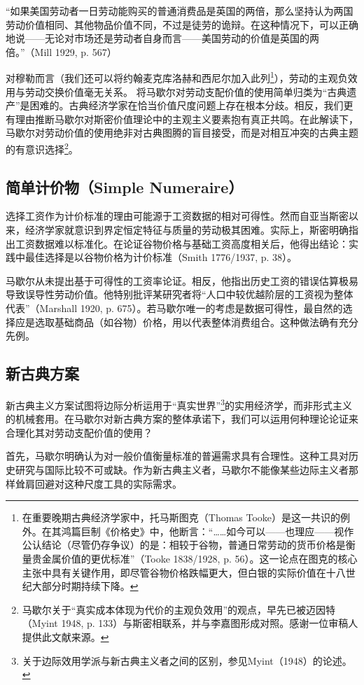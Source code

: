 \begin{translation}
“如果美国劳动者一日劳动能购买的普通消费品是英国的两倍，那么坚持认为两国劳动价值相同、其他物品价值不同，不过是徒劳的诡辩。在这种情况下，可以正确地说——无论对市场还是劳动者自身而言——美国劳动的价值是英国的两倍。”（Mill 1929, p. 567）

对穆勒而言（我们还可以将约翰麦克库洛赫和西尼尔加入此列\footnote{在重要晚期古典经济学家中，托马斯图克（Thomas Tooke）是这一共识的例外。在其鸿篇巨制《价格史》中，他断言：“……如今可以——也理应——视作公认结论（尽管仍存争议）的是：相较于谷物，普通日常劳动的货币价格是衡量贵金属价值的更优标准”（Tooke 1838/1928, p. 56）。这一论点在图克的核心主张中具有关键作用，即尽管谷物价格跌幅更大，但白银的实际价值在十八世纪大部分时期持续下降。}），劳动的主观负效用与劳动交换价值毫无关系。
将马歇尔对劳动支配价值的使用简单归类为“古典遗产”是困难的。古典经济学家在恰当价值尺度问题上存在根本分歧。相反，我们更有理由推断马歇尔对斯密价值理论中的主观主义要素抱有真正共鸣。在此解读下，马歇尔对劳动价值的使用绝非对古典图腾的盲目接受，而是对相互冲突的古典主题的有意识选择\footnote{马歇尔关于“真实成本体现为代价的主观负效用”的观点，早先已被迈因特（Myint 1948, p. 133）与斯密相联系，并与李嘉图形成对照。感谢一位审稿人提供此文献来源。}。

\subsection{简单计价物（Simple Numeraire）}

选择工资作为计价标准的理由可能源于工资数据的相对可得性。然而自亚当斯密以来，经济学家就意识到界定恒定特征与质量的劳动极其困难。实际上，斯密明确指出工资数据难以标准化。在论证谷物价格与基础工资高度相关后，他得出结论：实践中最佳选择是以谷物价格为计价标准（Smith 1776/1937, p. 38）。

马歇尔从未提出基于可得性的工资率论证。相反，他指出历史工资的错误估算极易导致误导性劳动价值。他特别批评某研究者将“人口中较优越阶层的工资视为整体代表”（Marshall 1920, p. 675）。若马歇尔唯一的考虑是数据可得性，最自然的选择应是选取基础商品（如谷物）价格，用以代表整体消费组合。这种做法确有充分先例。

\subsection{新古典方案}
新古典主义方案试图将边际分析运用于“真实世界”\footnote{关于边际效用学派与新古典主义者之间的区别，参见Myint（1948）的论述。}的实用经济学，而非形式主义的机械套用。在马歇尔对新古典方案的整体承诺下，我们可以运用何种理论论证来合理化其对劳动支配价值的使用？

首先，马歇尔明确认为对一般价值衡量标准的普遍需求具有合理性。这种工具对历史研究与国际比较不可或缺。作为新古典主义者，马歇尔不能像某些边际主义者那样耸肩回避对这种尺度工具的实际需求。


\end{translation}
